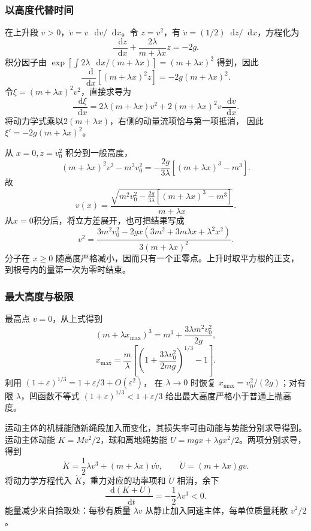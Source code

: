 \documentclass[UTF8,fontset=fandol,a4paper,11pt]{ctexart}
\newcommand{\dd}{\mathop{}\!\mathrm{d}}
\begin{document}
\subsubsection*{以高度代替时间}
在上升段 $v>0$，$\dot v=v\,\dd v/\dd x$。令 $z=v^2$，有 $\dot v=(1/2)\dd z/\dd x$，方程化为
\[
\frac{\dd z}{\dd x}+\frac{2\lambda}{m+\lambda x}z=-2g.
\]
积分因子由
$\exp[\int2\lambda\,\dd x/(m+\lambda x)]=(m+\lambda x)^2$
得到，因此
\[
\frac{\dd}{\dd x}\left[(m+\lambda x)^2z\right]
=-2g(m+\lambda x)^2.
\]
令$\xi=(m+\lambda x)^2v^2$，直接求导为
\[
\frac{\dd\xi}{\dd x}
=2\lambda(m+\lambda x)v^2
+2(m+\lambda x)^2v\frac{\dd v}{\dd x}.
\]
将动力学式乘以$2(m+\lambda x)$，右侧的动量流项恰与第一项抵消，
因此$\xi'=-2g(m+\lambda x)^2$。

从 $x=0,z=v_0^2$ 积分到一般高度，
\[
(m+\lambda x)^2v^2-m^2v_0^2
=-\frac{2g}{3\lambda}\left[(m+\lambda x)^3-m^3\right].
\]
故
\[
\boxed{v(x)=
\frac{\sqrt{m^2v_0^2-\frac{2g}{3\lambda}
[(m+\lambda x)^3-m^3]}}{m+\lambda x}}.
\]
从$x=0$积分后，将立方差展开，也可把结果写成
\[
v^2=\frac{3m^2v_0^2
-2gx(3m^2+3m\lambda x+\lambda^2x^2)}{3(m+\lambda x)^2}.
\]
分子在 $x\geq0$ 随高度严格减小，因而只有一个正零点。上升时取平方根的正支，到根号内的量第一次为零时结束。

\subsubsection*{最大高度与极限}
最高点 $v=0$，从上式得到
\[
(m+\lambda x_{\max})^3
=m^3+\frac{3\lambda m^2v_0^2}{2g},
\]
\[
\boxed{x_{\max}=\frac m\lambda
\left[\left(1+\frac{3\lambda v_0^2}{2mg}\right)^{1/3}-1\right]}.
\]
利用 $(1+\varepsilon)^{1/3}=1+\varepsilon/3+O(\varepsilon^2)$，
在 $\lambda\to0$ 时恢复 $x_{\max}=v_0^2/(2g)$；对有限 $\lambda$，凹函数不等式
$(1+\varepsilon)^{1/3}<1+\varepsilon/3$ 给出最大高度严格小于普通上抛高度。

运动主体的机械能随新绳段加入而变化，其损失率可由动能与势能分别求导得到。运动主体动能 $K=Mv^2/2$，球和离地绳势能
$U=mgx+\lambda gx^2/2$。两项分别求导，得到
\[
\dot K=\frac12\lambda v^3+(m+\lambda x)v\dot v,\qquad
\dot U=(m+\lambda x)gv.
\]
将动力学方程代入 $\dot K$，重力对应的功率项和 $\dot U$ 相消，余下
\[
\frac{\dd(K+U)}{\dd t}=-\frac12\lambda v^3<0.
\]
能量减少来自拾取处：每秒有质量 $\lambda v$ 从静止加入同速主体，每单位质量耗散 $v^2/2$。
\end{document}
